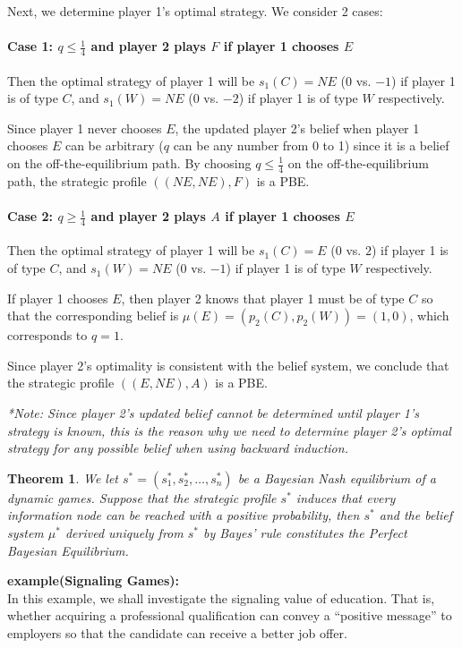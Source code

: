 \documentclass[twoside]{article}
\theoremstyle{definitionstyle}
\newtheorem*{theorem}{Theorem}
\begin{document}
Next, we determine player 1’s optimal strategy. We consider 2 cases:

\paragraph{Case 1: $q \le \frac{1}{4}$ and player 2 plays $F$ if player 1 chooses $E$}
Then the optimal strategy of player 1 will be $s_1(C) = NE$ ($0$ vs. $-1$) if player 1 is of type $C$, and $s_1(W) = NE$ ($0$ vs. $-2$) if player 1 is of type $W$ respectively.

Since player 1 never chooses $E$, the updated player 2’s belief when player 1 chooses $E$ can be arbitrary ($q$ can be any number from 0 to 1) since it is a belief on the off-the-equilibrium path. By choosing $q \le \frac{1}{4}$ on the off-the-equilibrium path, the strategic profile $((NE, NE), F)$ is a PBE.

\paragraph{Case 2: $q \ge \frac{1}{4}$ and player 2 plays $A$ if player 1 chooses $E$}
Then the optimal strategy of player 1 will be $s_1(C) = E$ ($0$ vs. $2$) if player 1 is of type $C$, and $s_1(W) = NE$ ($0$ vs. $-1$) if player 1 is of type $W$ respectively.

If player 1 chooses $E$, then player 2 knows that player 1 must be of type $C$ so that the corresponding belief is $\mu(E) = (p_2(C), p_2(W)) = (1, 0)$, which corresponds to $q = 1$.

Since player 2’s optimality is consistent with the belief system, we conclude that the strategic profile $((E, NE), A)$ is a PBE.

\vspace{0.5em}
\noindent\textit{*Note: Since player 2’s updated belief cannot be determined until player 1’s strategy is known, this is the reason why we need to determine player 2’s optimal strategy for any possible belief when using backward induction.}
%
%
%
\begin{theorem}
    We let $s^* = (s_1^*, s_2^*, \ldots, s_n^*)$ be a Bayesian Nash equilibrium of a dynamic games. Suppose that the strategic profile $s^*$ induces that 
    every information node can be reached with a positive probability, then $s^*$ and the belief system $\mu^*$ derived uniquely from $s^*$ by Bayes' rule constitutes the Perfect Bayesian Equilibrium.
\end{theorem}
%
%
%
\textbf{example(Signaling Games):}\\
In this example, we shall investigate the signaling value of education. That is, whether acquiring a professional qualification can convey a “positive message” to employers so that the candidate can receive a better job offer.
\end{document}
